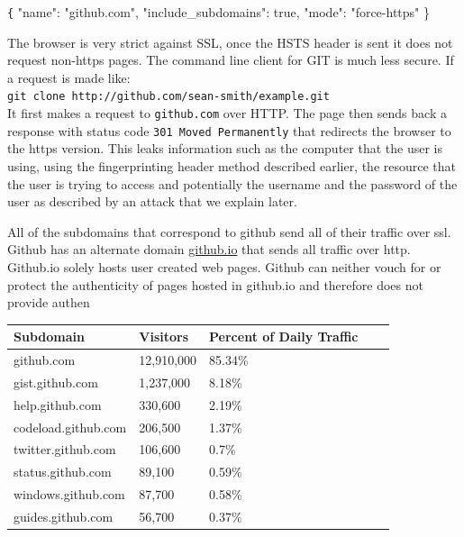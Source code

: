\documentclass[12pt]{article}
\makeatletter
\renewcommand{\tt}[1]{\texttt{#1}}
\renewenvironment{figure}
               {\def\@captype {figure}}
               {}
\renewenvironment{table}
               {\def\@captype {table}}
               {}
\makeatother
\begin{document}
{\tt \{ "name": "github.com", "include\_subdomains": true, "mode": "force-https" \}}

The browser is very strict against SSL, once the HSTS header is sent it does not request non-https pages. The command line client for GIT is much less secure. If a request is made like:\\ \tt{git clone http://github.com/sean-smith/example.git}\\ It first makes a request to \tt{github.com} over HTTP. The page then sends back a response with status code \tt{301 Moved Permanently} that redirects the browser to the https version. This leaks information such as the computer that the user is using, using the fingerprinting header method described earlier, the resource that the user is trying to access and potentially the username and the password of the user as described by an attack that we explain later.


All of the subdomains that correspond to github send all of their traffic over ssl. Github has an alternate domain \url{github.io} that sends all traffic over http. Github.io solely hosts user created web pages. Github can neither vouch for or protect the authenticity of pages hosted in github.io and therefore does not provide authen  \\

\begin{figure}
\begin{table}
\begin{tabular}{| l | l | l | l | l | }
\hline

\textbf{Subdomain} & \textbf{Visitors} & \textbf{Percent of Daily Traffic} \\ \hline
github.com & 12,910,000 & 85.34\% \\ \hline
gist.github.com & 1,237,000 & 8.18\%  \\ \hline
help.github.com & 330,600 & 2.19\%  \\ \hline
codeload.github.com & 206,500 & 1.37\%  \\ \hline
twitter.github.com & 106,600 & 0.7\%  \\ \hline
status.github.com & 89,100 & 0.59\%  \\ \hline
windows.github.com & 87,700 & 0.58\%  \\ \hline
guides.github.com & 56,700 & 0.37\%  \\ \hline
\end{tabular}
\end{table}\\
\centering
\caption{Subdomains\newline}
\label{fig:mig_over}
\end{figure}
\end{document}
